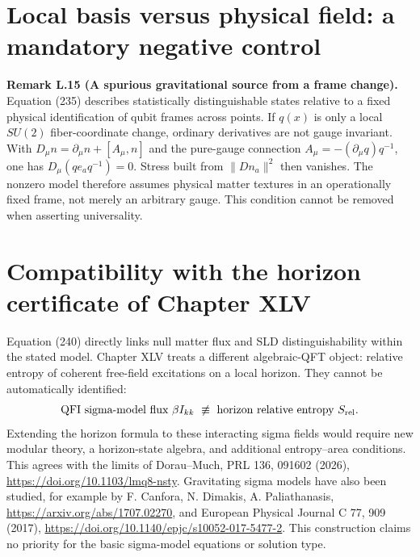 \documentclass[11pt,a4paper,oneside]{book}
\newcommand{\statement}[3]{\par\medskip\noindent\textbf{#1 #2 (#3).}\ }
\begin{document}
\section{Local basis versus physical field: a mandatory negative control}
\statement{Remark}{L.15}{A spurious gravitational source from a frame change}
Equation (235) describes statistically distinguishable states relative to a fixed physical identification of qubit frames across points. If $q(x)$ is only a local $SU(2)$ fiber-coordinate change, ordinary derivatives are not gauge invariant. With $D_\mu n=\partial_\mu n+[A_\mu,n]$ and the pure-gauge connection $A_\mu=-(\partial_\mu q)q^{-1}$, one has $D_\mu(qe_aq^{-1})=0$. Stress built from $\|Dn_a\|^2$ then vanishes. The nonzero model therefore assumes physical matter textures in an operationally fixed frame, not merely an arbitrary gauge. This condition cannot be removed when asserting universality.
\section{Compatibility with the horizon certificate of Chapter XLV}
Equation (240) directly links null matter flux and SLD distinguishability within the stated model. Chapter XLV treats a different algebraic-QFT object: relative entropy of coherent free-field excitations on a local horizon. They cannot be automatically identified:
\[\text{QFI sigma-model flux }\beta I_{kk}\ \not\equiv\ \text{horizon relative entropy }S_{\rm rel}.\]
Extending the horizon formula to these interacting sigma fields would require new modular theory, a horizon-state algebra, and additional entropy--area conditions. This agrees with the limits of Dorau--Much, PRL 136, 091602 (2026), \url{https://doi.org/10.1103/lmq8-nsty}. Gravitating sigma models have also been studied, for example by F. Canfora, N. Dimakis, A. Paliathanasis, \url{https://arxiv.org/abs/1707.02270}, and European Physical Journal C 77, 909 (2017), \url{https://doi.org/10.1140/epjc/s10052-017-5477-2}. This construction claims no priority for the basic sigma-model equations or solution type.
\end{document}
